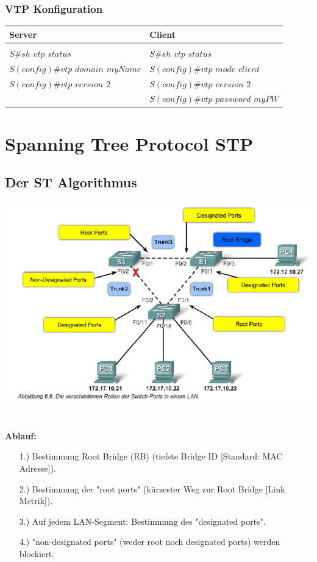 \documentclass[landscape,twocolumn,a4paper]{article}
\begin{document}
\begin{footnotesize}
\subsubsection{VTP Konfiguration}
\begin{tabular}{l | l}
	\textbf{Server} & \textbf{Client} \\
	\hline \\
	$S\#sh$ $vtp$ $status$ & $S\#sh$ $vtp$ $status$ \\
	$S(config)\#vtp$ $domain$ $myName$ & $S(config)\#vtp$ $mode$ $client$ \\
	$S(config)\#vtp$ $version$ $2$ & $S(config)\#vtp$ $version$ $2$ \\
	 & $S(config)\#vtp$ $password$ $myPW$
\end{tabular}


\section{Spanning Tree Protocol STP}
\subsection{Der ST Algorithmus}
\includegraphics[scale=0.40]{stp.png}\\\\\\
\textbf{Ablauf:}
\vspace{-3mm}
\begin{itemize}
	\item[1.)] Bestimmung Root Bridge (RB) (tiefste Bridge ID [Standard: MAC Adresse]).
	\item[2.)] Bestimmung der "root ports" (kürzester Weg zur Root Bridge [Link Metrik]).
	\item[3.)] Auf jedem LAN-Segment: Bestimmung des "designated ports".
	\item[4.)] "non-designated ports" (weder root noch designated ports) werden blockiert.
\end{itemize}


\end{footnotesize}
\end{document}
